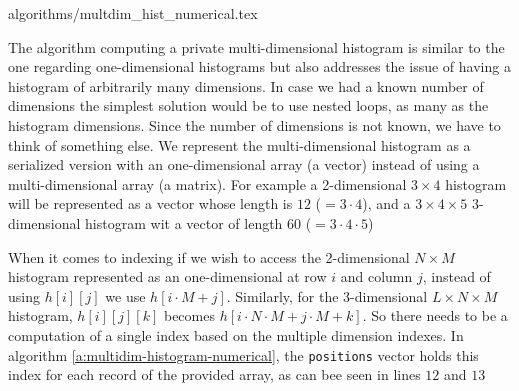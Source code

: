 


{algorithms/multdim_hist_numerical.tex}

The algorithm computing a private multi-dimensional histogram is similar to the one regarding one-dimensional histograms but also addresses the issue of having a histogram of arbitrarily many dimensions.
In case we had a known number of dimensions the simplest solution would be to use nested loops, as many as the histogram dimensions.
Since the number of dimensions is not known, we have to think of something else.
We represent the multi-dimensional histogram as a serialized version with an one-dimensional array (a vector) instead of using a multi-dimensional array (a matrix).
For example a 2-dimensional $3 \times 4$ histogram will be represented as a vector whose length is $ 12 $ ($= 3 \cdot 4$), and a $3 \times 4 \times 5$ 3-dimensional histogram wit a vector of length $ 60 $ ($= 3 \cdot 4 \cdot 5$)

When it comes to indexing if we wish to access the 2-dimensional $N \times M$ histogram represented as an one-dimensional at row $ i $ and column $ j $, instead of using $h[i][j]$ we use $h[i \cdot M + j]$.
Similarly, for the 3-dimensional $L \times N \times M$ histogram, $h[i][j][k]$ becomes $h[i \cdot N \cdot M + j \cdot M + k]$. So there needs to be a computation of a single index based on the multiple dimension indexes. In algorithm \ref{a:multidim-histogram-numerical}, the \texttt{positions} vector holds this index for each record of the provided array, as can bee seen in lines $ 12 $ and $ 13 $



